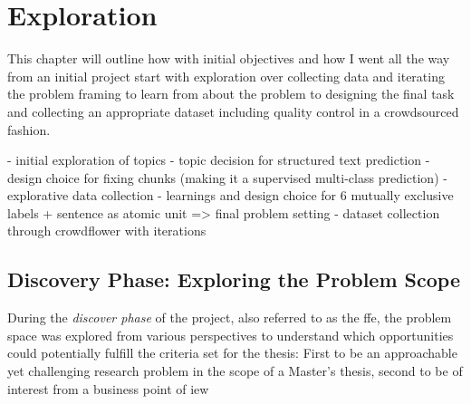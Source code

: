 
\clearpage

\section{Exploration}
\label{sec:Exploration}

This chapter will outline how with initial objectives and how I went all the way from an initial project start with exploration over collecting data and iterating the problem framing to learn from about the problem to designing the final task and collecting an appropriate dataset including quality control in a crowdsourced fashion. 



- initial exploration of topics
- topic decision for structured text prediction
- design choice for fixing chunks (making it a supervised multi-class prediction)
- explorative data collection
- learnings and design choice for 6 mutually exclusive labels + sentence as atomic unit => final problem setting
- dataset collection through crowdflower with iterations








\subsection{Discovery Phase: Exploring the Problem Scope}
\label{Discovery Phase: Exploring the Problem Scope}

During the \emph{discover phase} of the project, also referred to as the \gls{ffe}, the problem space was explored from various perspectives to understand which opportunities could potentially fulfill the criteria set for the thesis: First to be an approachable yet challenging research problem in the scope of a Master's thesis, second to be of interest from a business point of iew

